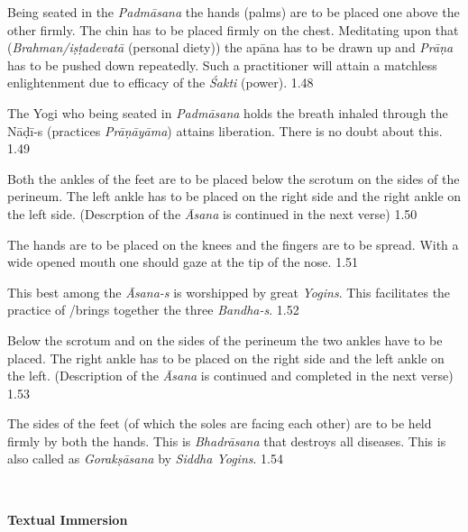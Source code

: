
Being seated in the \textit{Padmāsana} the hands (palms) are to be placed one above the other firmly. The chin has to be placed firmly on the chest. Meditating upon that (\textit{Brahman/iṣṭadevatā} (personal diety)) the apāna has to be drawn up and \textit{Prāṇa} has to be pushed down repeatedly. Such a practitioner will attain a matchless enlightenment due to efficacy of the \textit{Śakti} (power). 1.48


The Yogi who being seated in \textit{Padmāsana} holds the breath inhaled through the Nāḍī-s (practices \textit{Prāṇāyāma}) attains liberation. There is no doubt about this. 1.49
\medskip


Both the ankles of the feet are to be placed below the scrotum on the sides of the perineum. The left ankle has to be placed on the right side and the right ankle on the left side. (Descrption of the \textit{Āsana} is continued in the next verse) 1.50

The hands are to be placed on the knees and the fingers are to be spread. With a wide opened mouth one should gaze at the tip of the nose. 1.51


This best among the \textit{Āsana-s} is worshipped by great \textit{Yogins}. This facilitates the practice of /brings together the three \textit{Bandha-s}.  1.52
\medskip


Below the scrotum and on the sides of the perineum the two ankles have to be placed. The right ankle has to be placed on the right side and the left ankle on the left. (Description of the \textit{Āsana} is continued and completed in the next verse) 1.53

The sides of the feet (of which the soles are facing each other) are to be held firmly by both the hands. This is \textit{Bhadrāsana} that destroys all diseases. This is also called as \textit{Gorakṣāsana} by \textit{Siddha Yogins}. 1.54
\newpage

\thispagestyle{empty}
~
\vfill
\begin{center}
\textbf{\Huge Textual Immersion}
\end{center}
\vfill
\eject

